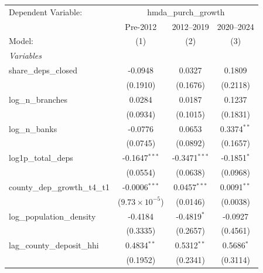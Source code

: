 \begingroup
\centering
\begin{tabular}{lccc}
   \tabularnewline \midrule \midrule
   Dependent Variable: & \multicolumn{3}{c}{hmda\_purch\_growth}\\
                                                  & Pre-2012                & 2012–2019       & 2020–2024 \\   
   Model:                                         & (1)                     & (2)             & (3)\\  
   \midrule
   \emph{Variables}\\
   share\_deps\_closed                            & -0.0948                 & 0.0327          & 0.1809\\   
                                                  & (0.1910)                & (0.1676)        & (0.2118)\\   
   log\_n\_branches                               & 0.0284                  & 0.0187          & 0.1237\\   
                                                  & (0.0934)                & (0.1015)        & (0.1831)\\   
   log\_n\_banks                                  & -0.0776                 & 0.0653          & 0.3374$^{**}$\\   
                                                  & (0.0745)                & (0.0892)        & (0.1657)\\   
   log1p\_total\_deps                             & -0.1647$^{***}$         & -0.3471$^{***}$ & -0.1851$^{*}$\\   
                                                  & (0.0554)                & (0.0638)        & (0.0968)\\   
   county\_dep\_growth\_t4\_t1                    & -0.0006$^{***}$         & 0.0457$^{***}$  & 0.0091$^{**}$\\   
                                                  & ($9.73\times 10^{-5}$)  & (0.0146)        & (0.0038)\\   
   log\_population\_density                       & -0.4184                 & -0.4819$^{*}$   & -0.0927\\   
                                                  & (0.3335)                & (0.2657)        & (0.4561)\\   
   lag\_county\_deposit\_hhi                      & 0.4834$^{**}$           & 0.5312$^{**}$   & 0.5686$^{*}$\\   
                                                  & (0.1952)                & (0.2341)        & (0.3114)\\   

\end{tabular}
